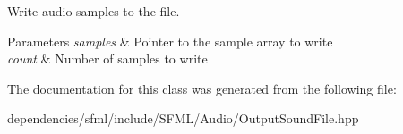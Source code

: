 Write audio samples to the file. 


\begin{DoxyParams}{Parameters}
{\em samples} & Pointer to the sample array to write \\
\hline
{\em count} & Number of samples to write \\
\hline
\end{DoxyParams}


The documentation for this class was generated from the following file\+:\begin{DoxyCompactItemize}
\item 
dependencies/sfml/include/\+S\+F\+M\+L/\+Audio/Output\+Sound\+File.\+hpp\end{DoxyCompactItemize}
